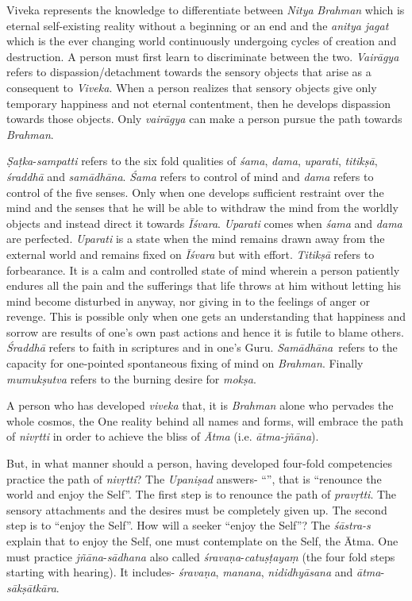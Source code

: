 Viveka represents the knowledge to differentiate between \emph{Nitya} \emph{Brahman} which is eternal self-existing reality without a beginning or an end and the \emph{anitya} \emph{jagat} which is the ever changing world continuously undergoing cycles of creation and destruction. A person must first learn to discriminate between the two. \emph{Vairāgya} refers to dispassion/detachment towards the sensory objects that arise as a consequent to \emph{Viveka}. When a person realizes that sensory objects give only temporary happiness and not eternal contentment, then he develops dispassion towards those objects. Only \emph{vairāgya} can make a person pursue the path towards \emph{Brahman}.

\emph{Ṣaṭka}-\emph{sampatti} refers to the six fold qualities of \emph{śama}, \emph{dama}, \emph{uparati}, \emph{titikṣā}, \emph{śraddhā} and \emph{samādhāna}. \emph{Śama} refers to control of mind and \emph{dama} refers to control of the five senses. Only when one develops sufficient restraint over the mind and the senses that he will be able to withdraw the mind from the worldly objects and instead direct it towards \emph{Īśvara}. \emph{Uparati} comes when \emph{śama} and \emph{dama} are perfected. \emph{Uparati} is a state when the mind remains drawn away from the external world and remains fixed on \emph{Īśvara} but with effort. \emph{Titikṣā} refers to forbearance. It is a calm and controlled state of mind wherein a person patiently endures all the pain and the sufferings that life throws at him without letting his mind become disturbed in anyway, nor giving in to the feelings of anger or revenge. This is possible only when one gets an understanding that happiness and sorrow are results of one's own past actions and hence it is futile to blame others. \emph{Śraddhā} refers to faith in scriptures and in one's Guru. \emph{Samādhāna}~refers to the capacity for one-pointed spontaneous fixing of mind on \emph{Brahman}. Finally \emph{mumukṣutva} refers to the burning desire for \emph{mokṣa}.

A person who has developed \emph{viveka} that, it is \emph{Brahman} alone who pervades the whole cosmos, the One reality behind all names and forms, will embrace the path of \emph{nivṛtti} in order to achieve the bliss of \emph{Ātma} (i.e. \emph{ātma-jñāna}).

But, in what manner should a person, having developed four-fold competencies practice the path of \emph{nivṛtti}? The \emph{Upaniṣad} answers- ``'', that is ``renounce the world and enjoy the Self''. The first step is to renounce the path of \emph{pravṛtti}. The sensory attachments and the desires must be completely given up. The second step is to ``enjoy the Self''. How will a seeker ``enjoy the Self''? The \emph{śāstra-s} explain that to enjoy the Self, one must contemplate on the Self, the Ātma. One must practice \emph{jñāna}-\emph{sādhana} also called \emph{śravaṇa}-\emph{catuṣṭayaṃ} (the four fold steps starting with hearing). It includes- \emph{śravaṇa}, \emph{manana}, \emph{nididhyāsana} and \emph{ātma}-\emph{sākṣātkāra}.

